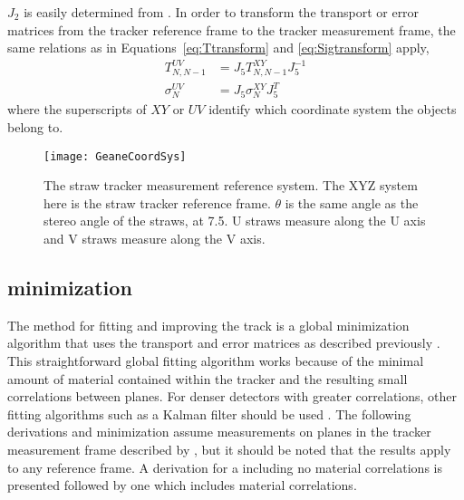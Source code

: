 $J_{2}$ is easily determined from . In order to transform the transport or error matrices from the tracker reference frame to the tracker measurement frame, the same relations as in Equations~\ref{eq:Ttransform} and \ref{eq:Sigtransform} apply,
    \begin{align}
        T_{N,N-1}^{UV} &= J_{5} T_{N,N-1}^{XY} J_{5}^{-1} \\
        \sigma_{N}^{UV} &= J_{5} \sigma_{N}^{XY} J_{5}^{T}
    \end{align}
where the superscripts of $XY$ or $UV$ identify which coordinate system the objects belong to.

\begin{figure}[]
  \centering
  \texttt{[image: GeaneCoordSys]}
    \caption[Natural tracker measurement system]{The straw tracker measurement reference system. The XYZ system here is the straw tracker reference frame. $\theta$ is the same angle as the stereo angle of the straws, at 7.5\textdegree{}. U straws measure along the U axis and V straws measure along the V axis.}
    \label{fig:GeaneCoordSys}
\end{figure}




\subsection{\texorpdfstring{\chisq}{chisq} minimization}
\label{sec:TrackFittingAlgorithm}


The method for fitting and improving the track is a global \chisq minimization algorithm that uses the transport and error matrices as described previously \cite{geanemanual,trajfit}. This straightforward global fitting algorithm works because of the minimal amount of material contained within the tracker and the resulting small correlations between planes. For denser detectors with greater correlations, other fitting algorithms such as a Kalman filter should be used \cite{Lavezzi}. The following derivations and minimization assume measurements on planes in the tracker measurement frame described by , but it should be noted that the results apply to any reference frame. A derivation for a \chisq including no material correlations is presented followed by one which includes material correlations.


